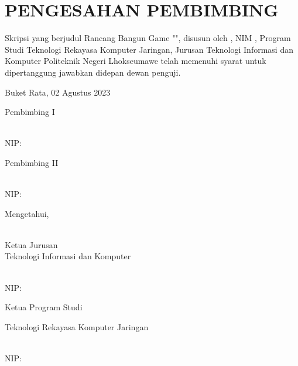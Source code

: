 \chapter*{PENGESAHAN PEMBIMBING}
\noindent

Skripsi yang berjudul Rancang Bangun Game "\judulId", disusun oleh \mahasiswa, NIM \nim, Program Studi Teknologi Rekayasa Komputer Jaringan, Jurusan Teknologi Informasi dan Komputer Politeknik Negeri Lhokseumawe telah memenuhi syarat untuk dipertanggung jawabkan didepan dewan penguji.


\vspace*{1cm}
\noindent 
\tabto{7.84cm}Buket Rata, 02 Agustus 2023\\
\noindent \begin{minipage}[t]{0.45\linewidth}
\noindent
Pembimbing I
  
\vspace*{2cm}
\textbf{\pembimbingUtama} \\
NIP: \nipPembimbingUtama
\end{minipage}
\hspace{0.1\linewidth}
\begin{minipage}[t]{0.45\linewidth}
  \noindent
  Pembimbing II
  
  \vspace*{2cm}
  \textbf{\pembimbingPendamping} \\
  NIP: \nipPembimbingPendamping
\end{minipage}

\vspace*{1cm}
\noindent 
\tabto{5.8cm}Mengetahui,\\
\\
\noindent \begin{minipage}[t]{0.45\linewidth}
\noindent
Ketua Jurusan\\
Teknologi Informasi dan Komputer
  
\vspace*{2cm}
\textbf{\kajur} \\
NIP: \nipKajur
\end{minipage}
\hspace{0.1\linewidth}
\begin{minipage}[t]{0.60\linewidth}
    \noindent
    Ketua Program Studi\\
    \raggedright Teknologi Rekayasa Komputer Jaringan
    
    \vspace*{2cm}
    \textbf{\kaprodi} \\
    NIP: \nipKaprodi
  \end{minipage}
  
  

